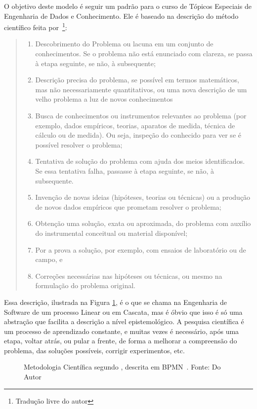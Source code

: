 O objetivo deste modelo é seguir um padrão para o curso de Tópicos Especiais de Engenharia de Dados e Conhecimento. Ele é baseado na descrição do método científico feita por~\citep[p. 39-40]{Bunge2002}\footnote{Tradução livre do autor}:
\begin{quote}
\begin{enumerate}
    \item Descobrimento do Problema ou lacuna em um conjunto de conhecimentos. Se o problema não está enunciado com clareza, se passa à etapa seguinte, se não, à subsequente;
    \item Descrição precisa do problema, se possível em termos matemáticos, mas não necessariamente quantitativos, ou uma nova descrição de um velho problema a luz de novos conhecimentos 
    \item Busca de conhecimentos ou instrumentos relevantes ao problema (por exemplo, dados empíricos, teorias, aparatos de medida, técnica de cálculo ou de medida). Ou seja, inspeção do conhecido para ver se é possível resolver o problema;
    \item Tentativa de solução do problema com ajuda dos meios identificados. Se essa tentativa falha, passasse à etapa seguinte, se não, à subsequente.
    \item Invenção de novas ideias (hipóteses, teorias ou técnicas) ou a produção de novos dados empíricos que prometam resolver o problema;
    \item Obtenção uma solução, exata ou aproximada, do problema com auxílio do instrumental conceitual ou material disponível;
    \item Por a prova a solução, por exemplo, com ensaios de laboratório ou de campo, e
    \item Correções necessárias nas hipóteses ou técnicas, ou mesmo na formulação do problema original.
\end{enumerate}
\end{quote}

Essa descrição, ilustrada na Figura \ref{fig:bunge}, é o que se chama na Engenharia de Software de um processo Linear ou em Cascata, mas é óbvio que isso é só uma abstração que facilita a descrição a nível epistemológico. A pesquisa científica é um processo de aprendizado constante, e muitas vezes é necessário, após uma etapa, voltar atrás, ou pular a frente, de forma a melhorar a compreensão do problema, das soluções possíveis, corrigir experimentos, etc.

\begin{figure}[hbt]
    \centering
    
    \caption{Metodologia Científica segundo \citet{Bunge2002}, descrita em BPMN~\citep{omg2013bpmn}. Fonte: Do Autor}
    \label{fig:bunge}
\end{figure}

